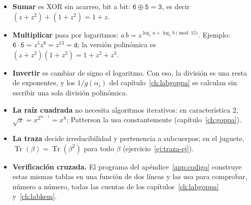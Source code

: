 \documentclass[11pt,a4paper,oneside]{report}
\DeclareMathOperator{\Tr}{Tr}
\begin{document}
\begin{itemize}[leftmargin=1.5em,itemsep=3pt]
  \item \textbf{Sumar} es XOR sin acarreo, bit a bit:
        $\mathtt{6}\oplus\mathtt{5}=\mathtt{3}$, es decir
        $(z+z^2)+(1+z^2)=1+z$.
  \item \textbf{Multiplicar} pasa por logaritmos:
        $a\,b=z^{\log_z a+\log_z b \pmod{15}}$. Ejemplo:
        $\mathtt{6}\cdot\mathtt{5}=z^{5}z^{8}=z^{13}=\mathtt{d}$;
        la versión polinómica es
        $(z+z^2)(1+z^2)=1+z^2+z^3$.
  \item \textbf{Invertir} es cambiar de signo el logaritmo. Con eso,
        la división es una resta de exponentes, y los
        $1/g(\alpha_i)$ del capítulo~\ref{ch:labgoppa} se calculan
        sin escribir una sola división polinómica.
  \item \textbf{La raíz cuadrada} no necesita algoritmos iterativos:
        en característica $2$, $\sqrt{x}=x^{2^{m-1}}=x^8$; Patterson
        la usa constantemente (capítulo~\ref{ch:goppa}).
  \item \textbf{La traza} decide irreducibilidad y pertenencia a
        subcuerpos; en el juguete, $\Tr(\beta)=\Tr(\beta^2)$ para
        todo $\beta$ (ejercicio~\ref{ej:traza-ej}).
  \item \textbf{Verificación cruzada.} El programa del
        apéndice~\ref{app:codigo} construye estas mismas tablas en
        una función de dos líneas y las usa para comprobar, número a
        número, todas las cuentas de los
        capítulos~\ref{ch:labgoppa} y~\ref{ch:labkem}.
\end{itemize}

\end{document}

